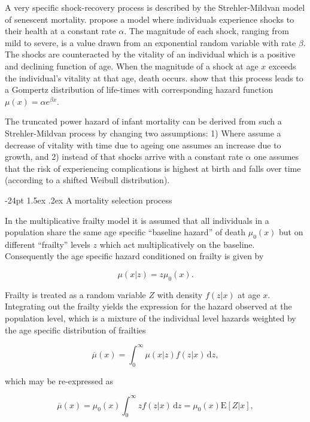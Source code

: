 \documentclass[10pt, twoside, parskip=half]{article}
\makeatletter
\renewcommand\subsection{\@startsection{subsection}{2}{\z@}%
                                     {-24pt}%
                                     {1.5ex \@plus .2ex}%
                                     {\normalfont\normalsize\bfseries}}
\makeatother
\begin{document}
A very specific shock-recovery process is described by the
Strehler-Mildvan model of senescent mortality. \citet{Strehler1960}
propose a model where individuals experience shocks to their health at a
constant rate \(\alpha\). The magnitude of each shock, ranging from mild
to severe, is a value drawn from an exponential random variable with
rate \(\beta\). The shocks are counteracted by the vitality of an
individual which is a positive and declining function of age. When the
magnitude of a shock at age \(x\) exceeds the individual's vitality at
that age, death occurs. \citet{Strehler1960} show that this process
leads to a Gompertz distribution of life-times with corresponding hazard
function \(\mu(x)=\alpha e^{\beta x}\).

The truncated power hazard of infant mortality can be derived from such
a Strehler-Mildvan process by changing two assumptions: 1) Where
\citet{Strehler1960} assume a decrease of vitality with time due to
ageing one assumes an increase due to growth, and 2) instead of that
shocks arrive with a constant rate \(\alpha\) one assumes that the risk
of experiencing complications is highest at birth and falls over time
(according to a shifted Weibull distribution).

\subsection{A mortality selection
process}\label{a-mortality-selection-process}

In the multiplicative frailty model \citep{Vaupel1979} it is assumed
that all individuals in a population share the same age specific
``baseline hazard'' of death \(\mu_0(x)\) but on different ``frailty''
levels \(z\) which act multiplicatively on the baseline. Consequently
the age specific hazard conditioned on frailty is given by

\[
\mu(x|z) = z\mu_0(x).
\]

Frailty is treated as a random variable \(Z\) with density \(f(z|x)\) at
age \(x\). Integrating out the frailty yields the expression for the
hazard observed at the population level, which is a mixture of the
individual level hazards weighted by the age specific distribution of
frailties

\[
\overline{\mu}(x) = \int_0^\infty \mu(x|z)f(z|x)\,\text{d}z,
\]

which may be re-expressed as

\[
\overline{\mu}(x) = \mu_0(x)\int_0^\infty zf(z|x)\,\text{d}z = \mu_0(x)\text{E}[Z|x],
\]
\end{document}
